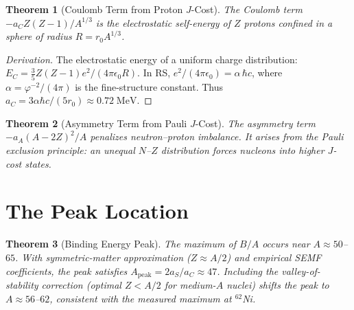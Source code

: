 \documentclass[12pt,a4paper]{article}
\newtheorem{theorem}{Theorem}[section]
\theoremstyle{definition}
\theoremstyle{remark}
\begin{document}
\begin{theorem}[Coulomb Term from Proton $J$-Cost]
\label{thm:coulomb}
The Coulomb term $-a_C Z(Z-1)/A^{1/3}$ is the electrostatic
self-energy of $Z$ protons confined in a sphere of radius
$R = r_0 A^{1/3}$.
\end{theorem}

\begin{proof}[Derivation]
The electrostatic energy of a uniform charge distribution:
$E_C = \tfrac{3}{5} Z(Z-1) e^2/(4\pi\epsilon_0 R)$.  In RS,
$e^2/(4\pi\epsilon_0) = \alpha\,\hbar c$, where
$\alpha = \varphi^{-2}/(4\pi)$ is the fine-structure constant.
Thus $a_C = 3\alpha\hbar c/(5 r_0) \approx 0.72\;\mathrm{MeV}$.
\end{proof}

\begin{theorem}[Asymmetry Term from Pauli $J$-Cost]
\label{thm:asymmetry}
The asymmetry term $-a_A(A - 2Z)^2/A$ penalizes neutron--proton
imbalance.  It arises from the Pauli exclusion principle: an
unequal $N$--$Z$ distribution forces nucleons into higher
$J$-cost states.
\end{theorem}

\section{The Peak Location}
\label{sec:peak}

\begin{theorem}[Binding Energy Peak]
\label{thm:peak}
The maximum of $B/A$ occurs near $A \approx 50$--$65$.
With symmetric-matter approximation ($Z \approx A/2$) and
empirical SEMF coefficients, the peak satisfies
$A_{\mathrm{peak}} = 2a_S/a_C \approx 47$.  Including the
valley-of-stability correction (optimal $Z < A/2$ for
medium-$A$ nuclei) shifts the peak to $A \approx 56$--$62$,
consistent with the measured maximum at $^{62}$Ni.
\end{theorem}
\end{document}
